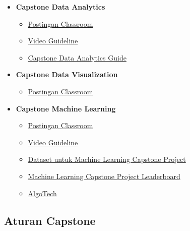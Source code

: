 \documentclass[
]{book}
\providecommand{\tightlist}{%
  \setlength{\itemsep}{0pt}\setlength{\parskip}{0pt}}
\begin{document}
\begin{itemize}
\item
  \textbf{Capstone Data Analytics}

  \begin{itemize}
  \tightlist
  \item
    \href{https://docs.google.com/document/d/1leWbp3Eb2AwumFieuHiWStSNOXsKJQJD_h0tAhA2fLs/edit\#heading=h.sdnb3cqdb3}{Postingan Classroom}
  \item
    \href{http://bit.ly/capstone-da-video}{Video Guideline}
  \item
    \href{http://bit.ly/template-capstone-da-guide}{Capstone Data Analytics Guide}
  \end{itemize}
\item
  \textbf{Capstone Data Visualization}

  \begin{itemize}
  \tightlist
  \item
    \href{https://docs.google.com/document/d/1leWbp3Eb2AwumFieuHiWStSNOXsKJQJD_h0tAhA2fLs/edit\#heading=h.jioetifqgq8a}{Postingan Classroom}
  \end{itemize}
\item
  \textbf{Capstone Machine Learning}

  \begin{itemize}
  \tightlist
  \item
    \href{https://docs.google.com/document/d/1leWbp3Eb2AwumFieuHiWStSNOXsKJQJD_h0tAhA2fLs/edit\#heading=h.kum7jj8wqp5o}{Postingan Classroom}
  \item
    \href{http://bit.ly/capstone-ml-video}{Video Guideline}
  \item
    \href{https://bit.ly/captone-ml-dataset}{Dataset untuk Machine Learning Capstone Project}
  \item
    \href{https://algoritma.shinyapps.io/leaderboard_capsml/}{Machine Learning Capstone Project Leaderboard}
  \item
    \href{https://algotech.netlify.com/tags/capstone-ml/}{AlgoTech}
  \end{itemize}
\end{itemize}

\hypertarget{aturan-capstone}{%
\subsection{Aturan Capstone}\label{aturan-capstone}}
\end{document}
